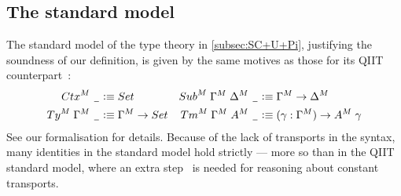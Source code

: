 \documentclass[a4paper,UKenglish,numberwithinsect,cleveref,thm-restate]{lipics-v2021}
\begin{document}
\subsection{The standard model} \label{subsec:std-model}
The standard model of the type theory in \cref{subsec:SC+U+Pi}, justifying the soundness of our definition, is given by the same motives as those for its QIIT counterpart~\cite[Section~4]{Altenkirch2016a}:
\begin{align*}
  \Ctx^M\;\nameless          & \defeq \Set              & \Sub^M\;\Gamma^M\;\Delta^M\;\nameless & \defeq \Gamma^M \to \Delta^M \\
  \Ty^M\;\Gamma^M\;\nameless & \defeq \Gamma^M \to \Set & \Tm^M\;\Gamma^M\;A^M\;\nameless & \defeq (\gamma : \Gamma^M) \to A^M\;\gamma
\end{align*}
%
See our \Agda formalisation for details.
Because of the lack of transports in the syntax, many identities in the standard model hold strictly --- more so than in the QIIT standard model, where an extra step~\cite[Lemma~2.3.5]{UFP2013} is needed for reasoning about constant transports.
\end{document}

